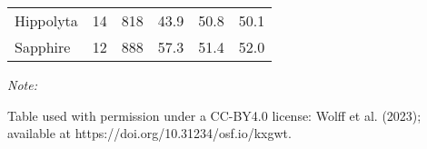 \documentclass[
  ,pub,floatsintext]{apa6}
\begin{document}
\begin{table}[!h]
\begin{threeparttable}
\begin{tabular}[t]{lccccc}
\hspace{1em}\hspace{1em}Hippolyta & 14 & 818 & 43.9 & 50.8 & 50.1\\
\hspace{1em}\hspace{1em}Sapphire & 12 & 888 & 57.3 & 51.4 & 52.0\\
\bottomrule
\end{tabular}
\begin{tablenotes}
\item \textit{Note: } 
\item Table used with permission under a CC-BY4.0 license: Wolff et al. (2023); available at https://doi.org/10.31234/osf.io/kxgwt.
\end{tablenotes}
\end{threeparttable}
\end{table}
\end{document}
